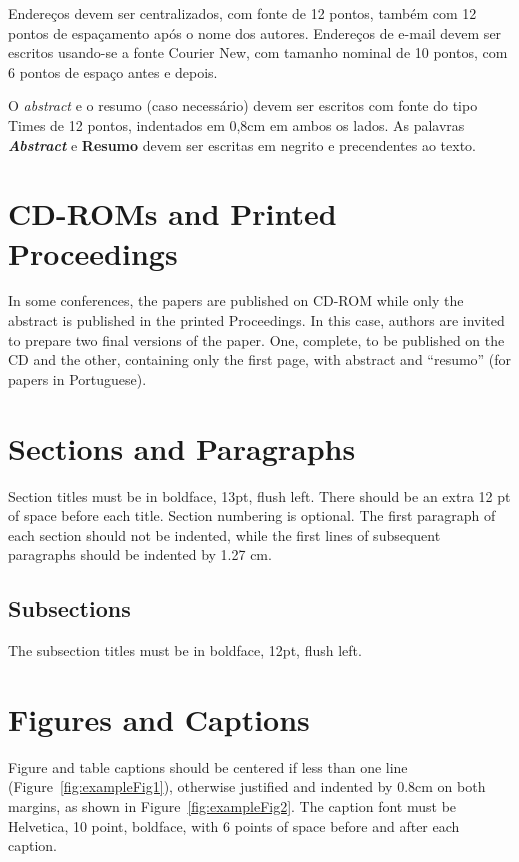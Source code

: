 \documentclass[12pt]{article}
\begin{document}
Endereços devem ser centralizados, com fonte de 12 pontos, também com 12 pontos de espaçamento após o nome dos autores. Endereços de e-mail devem ser escritos usando-se a fonte Courier New, com tamanho nominal de 10 pontos, com 6 pontos de espaço antes e depois.

O \emph{abstract} e o resumo (caso necessário) devem ser escritos com fonte do tipo Times de 12 pontos, indentados em 0,8cm em ambos os lados. As palavras \emph{\textbf{Abstract}} e \textbf{Resumo} devem ser escritas em negrito e precendentes ao texto.

\section{CD-ROMs and Printed Proceedings}

In some conferences, the papers are published on CD-ROM while only the
abstract is published in the printed Proceedings. In this case, authors are
invited to prepare two final versions of the paper. One, complete, to be
published on the CD and the other, containing only the first page, with
abstract and ``resumo'' (for papers in Portuguese).

\section{Sections and Paragraphs}

Section titles must be in boldface, 13pt, flush left. There should be an extra
12 pt of space before each title. Section numbering is optional. The first
paragraph of each section should not be indented, while the first lines of
subsequent paragraphs should be indented by 1.27 cm.

\subsection{Subsections}

The subsection titles must be in boldface, 12pt, flush left.

\section{Figures and Captions}\label{sec:figs}


Figure and table captions should be centered if less than one line
(Figure~\ref{fig:exampleFig1}), otherwise justified and indented by 0.8cm on
both margins, as shown in Figure~\ref{fig:exampleFig2}. The caption font must
be Helvetica, 10 point, boldface, with 6 points of space before and after each
caption.
\end{document}
